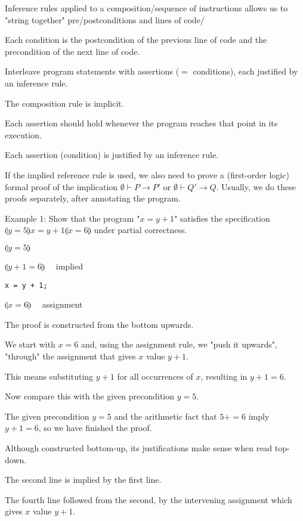 \documentclass{article}
\begin{document}
Inference rules applied to a composition/sequence of instructions allows us to "string together" pre/postconditions and lines of code/

Each condition is the postcondition of the previous line of code and the precondition of the next line of code.

Interleave program statements with assertions ($=$ conditions), each justified by an inference rule.

The composition rule is implicit.

Each assertion should hold whenever the program reaches that point in its execution. 

Each assertion (condition) is justified by an inference rule.

If the implied reference rule is used, we also need to prove a (first-order logic) formal proof of the implication $\emptyset \vdash P \rightarrow P'$ or $\emptyset \vdash Q' \rightarrow Q$. Usually, we do these proofs separately, after annotating the program.

Example 1: Show that the program "$x = y + 1$" satisfies the specification $\llparenthesis y = 5 \rrparenthesis x = y + 1 \llparenthesis x = 6 \rrparenthesis$ under partial correctness.

$\llparenthesis y = 5 \rrparenthesis$

$\llparenthesis y + 1 = 6 \rrparenthesis \quad$ implied

\begin{verbatim}
x = y + 1;
\end{verbatim}

$\llparenthesis x = 6 \rrparenthesis \quad$ assignment

The proof is constructed from the bottom upwards.

We start with $x =6$ and, using the assignment rule, we "push it upwards", "through" the assignment that gives $x$ value $y+1$.

This means substituting $y+1$ for all occurrences of $x$, resulting in $y + 1 = 6$.

Now compare this with the given precondition $y = 5$. 

The given precondition $y = 5$ and the arithmetic fact that $5+ = 6$ imply $y + 1 = 6$, so we have finished the proof.

Although constructed bottom-up, its justifications make sense when read top-down.

The second line is implied by the first line.

The fourth line followed from the second, by the intervening assignment which gives $x$ value $y+1$.
\end{document}
